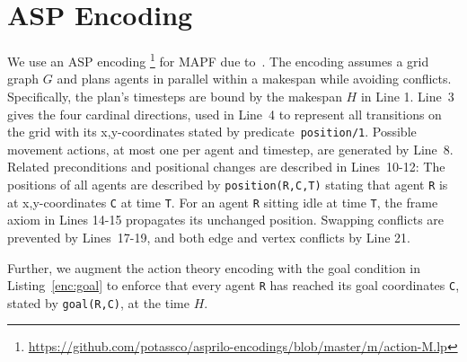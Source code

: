 \section{ASP Encoding}

%
%
We use an ASP encoding%
%
\footnote{%
 \url{https://github.com/potassco/asprilo-encodings/blob/master/m/action-M.lp}}
%
for MAPF %
due to~\cite{geobotscsangso18a}.
The encoding assumes a grid graph \(G\) and plans agents in parallel within a makespan while avoiding conflicts.
%
Specifically,
the plan's timesteps are bound by the makespan $H$ in Line 1.
%
Line~3 gives the four cardinal directions,
used in Line~4 to represent all transitions on the grid with its x,y-coordinates stated by predicate~\lstinline{position/1}.
Possible movement actions, at most one per agent and timestep, are generated by Line~8.
Related preconditions and positional changes are described in Lines~10-12:
The positions of all agents are described by \lstinline{position(R,C,T)} stating that agent \lstinline{R} is at x,y-coordinates \lstinline{C} at time \lstinline{T}.
%
For an agent \lstinline{R} sitting idle at time \lstinline{T},
the frame axiom in Lines 14-15 propagates its unchanged position.
%
Swapping conflicts are prevented by Lines~17-19, and both edge and vertex conflicts by Line 21.
%

%
%
%
Further,
we
augment the action theory encoding with the goal condition in Listing~\ref{enc:goal} to
enforce that every agent \lstinline{R} has reached its goal coordinates \lstinline{C}, stated by \lstinline{goal(R,C)},
at the time $H$.
%

%
%


